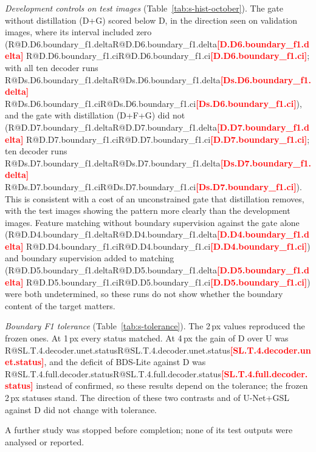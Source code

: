 \documentclass[10pt]{article}
\makeatletter
\newcommand{\R}[1]{\ifcsname R@#1\endcsname\csname R@#1\endcsname\else\textbf{\textcolor{red}{[#1]}}\fi}
\renewcommand\paragraph{\@startsection{paragraph}{4}{\z@}{1.6ex \@plus .5ex \@minus .2ex}{-1em}{\normalfont\normalsize\bfseries}}
\newcommand{\fitwidth}[1]{\sbox{\fitbox}{#1}\ifdim\wd\fitbox>\linewidth\resizebox{\linewidth}{!}{\usebox{\fitbox}}\else\usebox{\fitbox}\fi}
\makeatother
\begin{document}
\emph{Development controls on test images} (Table~\ref{tab:s-hist-october}). The gate without distillation (D+G) scored below D, in the direction seen on validation images, where its interval included zero (\R{D.D6.boundary_f1.delta} \R{D.D6.boundary_f1.ci}; with all ten decoder runs \R{Ds.D6.boundary_f1.delta} \R{Ds.D6.boundary_f1.ci}), and the gate with distillation (D+F+G) did not (\R{D.D7.boundary_f1.delta} \R{D.D7.boundary_f1.ci}; ten decoder runs \R{Ds.D7.boundary_f1.delta} \R{Ds.D7.boundary_f1.ci}). This is consistent with a cost of an unconstrained gate that distillation removes, with the test images showing the pattern more clearly than the development images. Feature matching without boundary supervision against the gate alone (\R{D.D4.boundary_f1.delta} \R{D.D4.boundary_f1.ci}) and boundary supervision added to matching (\R{D.D5.boundary_f1.delta} \R{D.D5.boundary_f1.ci}) were both undetermined, so these runs do not show whether the boundary content of the target matters.
\begin{table}[!htbp]\centering\scriptsize
\fitwidth{}
\caption{\label{tab:s-hist-october}Development controls re-evaluated post hoc on the official ISIC2018 test, three runs per arm, with 95\% intervals. Arms as in the development table above; D: the retrained arm, seeds 1--3. Holm over the eight contrasts.}
\end{table}

\emph{Boundary F1 tolerance} (Table~\ref{tab:s-tolerance}). The 2\,px values reproduced the frozen ones. At 1\,px every status matched. At 4\,px the gain of D over U was \R{SL.T.4.decoder.unet.status}, and the deficit of BDS-Lite against D was \R{SL.T.4.full.decoder.status} instead of confirmed, so these results depend on the tolerance; the frozen 2\,px statuses stand. The direction of these two contrasts and of U-Net+GSL against D did not change with tolerance.
\begin{table}[!htbp]\centering\small

\caption{\label{tab:s-tolerance}ISIC2018 official test, ten runs per arm: Boundary F1 differences at three matching tolerances, with the status by the frozen rule of the main text (confirmed: fresh seeds pass Holm with the same sign; detected, not confirmed: only the ten-run interval excludes zero; not detected: neither). Post hoc except at 2\,px.}
\end{table}

\paragraph{Stopped study.} A further study was stopped before completion; none of its test outputs were analysed or reported.
\end{document}
